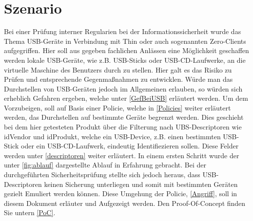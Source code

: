 			\chapter{Szenario}
Bei einer Prüfung interner Regularien bei der Informationssicherheit wurde das Thema USB-Geräte in Verbindung mit Thin oder auch sogenannten Zero-Clients aufgegriffen. Hier soll aus gegeben fachlichen Anlässen eine Möglichkeit geschaffen werden lokale USB-Geräte, wie z.B. USB-Sticks oder USB-CD-Laufwerke, an die virtuelle Maschine des Benutzers durch zu stellen. Hier galt es das Risiko zu Prüfen und entsprechende Gegenmaßnahmen zu entwicklen. 
Würde man das Durchstellen von USB-Geräten jedoch im Allgemeinen erlauben, so würden sich erheblich Gefahren ergeben, welche unter \ref{GefBeiUSB} erläutert werden. Um dem Vorzubeigen, soll auf Basis einer Policie, welche in \ref{Policies} weiter erläutert werden, das Durchstellen auf bestimmte Geräte begrenzt werden. Dies geschieht bei dem hier getesteten Produkt über die Filterung nach UBS-Descriptoren wie idVendor und idProdukt, welche ein USB-Device, z.B. einen bestimmten USB-Stick oder ein USB-CD-Laufwerk, eindeutig Identifiezieren sollen. Diese Felder werden unter \ref{descriptoren} weiter erläutert.
In einem ersten Schritt wurde der unter \ref{fig:ablauf} dargestellte Ablauf in Erfahrung gebracht.
Bei der durchgeführten Sicherheitsprüfung stellte sich jedoch heraus, dass USB-Descriptoren keinen Sicherung unterliegen und somit mit bestimmten Geräten gezielt Emuliert werden können. Diese Umgehung der Policie, \ref{Angriff}, soll in diesem Dokument erläuter und Aufgezeigt werden. Den Proof-Of-Concept finden Sie untern \ref{PoC}.

